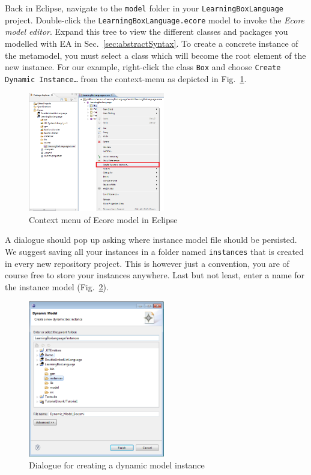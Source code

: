 Back in Eclipse, navigate to the \texttt{model} folder in your \texttt{LearningBoxLanguage} project.  
Double-click the \texttt{LearningBoxLanguage.ecore} model to invoke  the \emph{Ecore model editor}. 
Expand this tree to view the different classes and packages you modelled with EA in Sec.~\ref{sec:abstractSyntax}.
To create a concrete instance of the metamodel, you must select a class which will become the root element of the new instance.
For our example, right-click the class \texttt{Box} and choose \texttt{Create Dynamic Instance\ldots} from the context-menu as depicted in Fig.~\ref{fig:context_menu}. 

\begin{figure}[htbp]
	\centering 
  \includegraphics[width=0.53\textwidth]{pics/modelBrowserBilder/createInstance.png} 
	\caption{Context menu of Ecore model in Eclipse}
	\label{fig:context_menu}
\end{figure}

A dialogue should pop up asking where instance model file should be persisted.
We suggest saving all your instances in a folder named \texttt{instances} that is created in every new repository project.
This is however just a convention, you are of course free to store your instances anywhere.
Last but not least, enter a name for the instance model (Fig.~\ref{fig:store_dynamic_instance}). 

\begin{figure}[htbp]
	\centering 
  \includegraphics[width=0.53\textwidth]{pics/modelBrowserBilder/persistDialog.png} 
	\caption{Dialogue for creating a dynamic model instance}
	\label{fig:store_dynamic_instance}
\end{figure}
 
